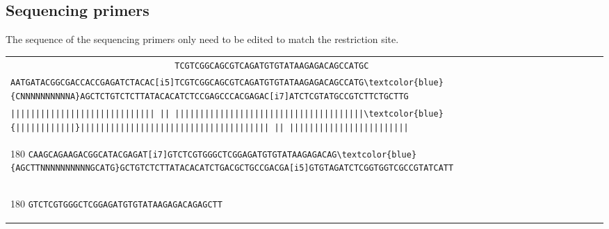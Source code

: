 \documentclass[a4paper,12pt]{article}
\begin{document}
\begin{flushleft}
\subsection*{Sequencing primers}
The sequence of the sequencing primers only need to be edited to match the restriction site.

\begin{tabular}{l}
\Verb+                                 TCGTCGGCAGCGTCAGATGTGTATAAGAGACAGCCATGC+\\[-8pt]
\Verb+AATGATACGGCGACCACCGAGATCTACAC[i5]TCGTCGGCAGCGTCAGATGTGTATAAGAGACAGCCATG\textcolor{blue}{CNNNNNNNNNNA}AGCTCTGTCTCTTATACACATCTCCGAGCCCACGAGAC[i7]ATCTCGTATGCCGTCTTCTGCTTG+\\[-8pt]
\Verb+||||||||||||||||||||||||||||| || ||||||||||||||||||||||||||||||||||||||\textcolor{blue}{||||||||||||}|||||||||||||||||||||||||||||||||||||| || ||||||||||||||||||||||||+\\[-10pt]
\begin{turn}{180}
   \Verb+CAAGCAGAAGACGGCATACGAGAT[i7]GTCTCGTGGGCTCGGAGATGTGTATAAGAGACAG\textcolor{blue}{AGCTTNNNNNNNNNNGCATG}GCTGTCTCTTATACACATCTGACGCTGCCGACGA[i5]GTGTAGATCTCGGTGGTCGCCGTATCATT+
\end{turn}
\\[-8pt]
\begin{turn}{180}
   \Verb+GTCTCGTGGGCTCGGAGATGTGTATAAGAGACAGAGCTT                                                                                  +
\end{turn}
\\
\end{tabular}



\end{flushleft}
 

\end{document}
